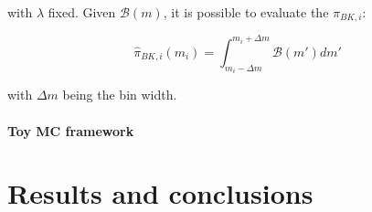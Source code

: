 \begin{refsection}
with $\lambda$ fixed.
Given $\mathcal{B}(m)$, it is possible to evaluate the $\hat{\pi}_{BK,i}$:

\begin{equation}
	\hat{\pi}_{BK,i} (m_i) = \int_{m_i - \Delta m}^{m_i + \Delta m} \mathcal{B}(m\prime)  dm\prime
\end{equation}

with $\Delta m$ being the bin width.

\paragraph{Toy MC framework}

\section{Results and conclusions}

\cite{X17:1996} \cite{X17:nuclear:2004} \cite{X17:Krasznahorkay:2015} \cite{X17:Ellwanger:2016} \cite{X17:Feng:2016} \cite{X17_Kozaczuk:2017} \cite{X17:Krasznahorkay:2017} \cite{X17:2019} \cite{X17:2021} 

\printbibliography[title=Bibliography on X17]
\end{refsection}
